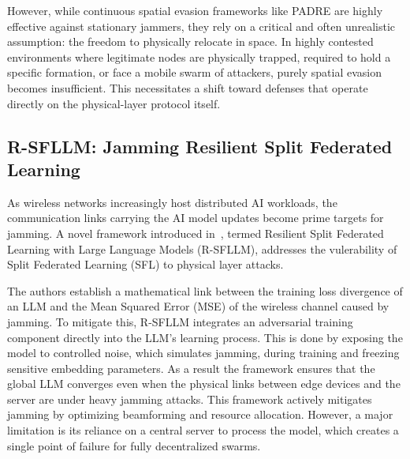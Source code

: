 \documentclass[conference]{IEEEtran}
\newcommand{\adm}[1]{{\color{orange}{[#1]}}}
\newcommand{\rar}[1]{{\color{blue}{[#1]}}}
\begin{document}
However, while continuous spatial evasion frameworks like PADRE are highly effective against stationary jammers, they rely on a critical and often unrealistic assumption: the freedom to physically relocate in space.
In highly contested environments where legitimate nodes are physically trapped, required to hold a specific formation, or face a mobile swarm of attackers, purely spatial evasion becomes insufficient.
This necessitates a shift toward defenses that operate directly on the physical-layer protocol itself.
\adm{yes, but we can also focus on phy-methods RW to keep it more relevant to your novel method's scope: it does not consider relocation but cooperative/synchronized PHY signal construction for max attack and max resiliency}
\rar{"it has strong assumptions than valianti (no phy tx power adaptation) but uses a more sophisticated rl model" -> maybe add this here somewhere}

\subsection{R-SFLLM: Jamming Resilient Split Federated Learning}
\rar{Before tackling these comments, decide whether its relevant for paper}
As wireless networks increasingly host distributed AI workloads, the communication links carrying the AI model updates become prime targets for jamming.
\adm{this is quite application-specific. we do not really mind what is carried by the application but rather focus on using AI-based methods to enhance system resiliency or attack impact}
A novel framework introduced in~\cite{djuhera2025r}, termed Resilient Split Federated Learning with Large Language Models (R-SFLLM), addresses the vulerability of Split Federated Learning (SFL) to physical layer attacks. 

The authors establish a mathematical link between the training loss divergence of an LLM and the Mean Squared Error (MSE) of the wireless channel caused by jamming.
\adm{the use case is a bit forced: app-layer problems and phy-layer problems can be disentangled and tackled separately}
To mitigate this, R-SFLLM integrates an adversarial training component directly into the LLM's learning process. 
This is done by exposing the model to controlled noise, which simulates jamming, during training and freezing sensitive embedding parameters. 
As a result the framework ensures that the global LLM converges \adm{i guess they are trying to train an LLM in a federated style? it is out of scope for this work} even when the physical links between edge devices and the server are under heavy jamming attacks.
\adm{this method focuses on an application. we want a method to mitigate jamming, not to propose a jamming-resilient application. it might be an interesting RQ but out of scope because we focus on jamming mitigation}
This framework actively mitigates jamming by optimizing beamforming and resource allocation. \adm{we can also use such guiding principles, but application-agnostic. i.e., LLM can be used as system optimizers and not as application (can be anything)}
However, a major limitation is its reliance on a central server to process the model, which creates a single point of failure for fully decentralized swarms.
\end{document}
